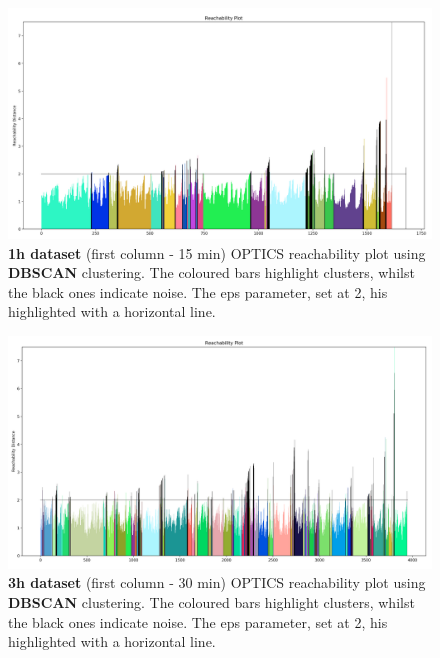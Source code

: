 \begin{figure}[H]
  \includegraphics[width=1\textwidth]{./images/OPTICS/1h-1-reachabilityPlot-DBSCAN.png}
  \caption{\textbf{1h dataset} (first column - 15 min) OPTICS reachability plot using \textbf{DBSCAN} clustering. The coloured bars highlight clusters, whilst the black ones indicate noise. The eps parameter, set at 2, his highlighted with a horizontal line.}
  \label{figure:fullSizeReachabilityPlotDBSCAN1h}
\end{figure}

\begin{figure}[H]
  \includegraphics[width=1\textwidth]{./images/OPTICS/3h-1-reachabilityPlot-DBSCAN.png}
  \caption{\textbf{3h dataset} (first column - 30 min) OPTICS reachability plot using \textbf{DBSCAN} clustering. The coloured bars highlight clusters, whilst the black ones indicate noise. The eps parameter, set at 2, his highlighted with a horizontal line.}
  \label{figure:fullSizeReachabilityPlotDBSCAN3h}
\end{figure}




